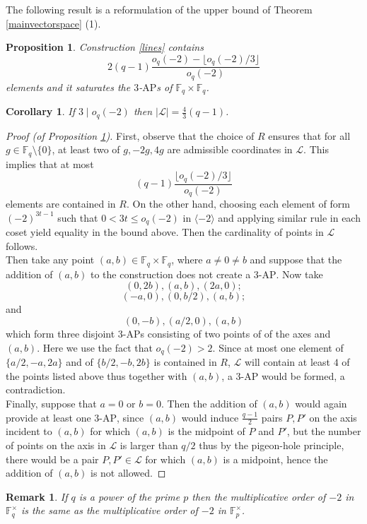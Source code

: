 \documentclass[11pt]{article}
\numberwithin{table}{section}
\newcommand{\cL}{{\mathcal L}}
\newcommand{\F}{{\mathbb F}}
\newtheorem{remark}[theorem]{Remark}
\newtheorem{cor}[theorem]{\bf Corollary}
\newtheorem{prop}[theorem]{\bf Proposition}
\theoremstyle{definition}
\begin{document}
	The following result is a reformulation of the upper bound of Theorem \ref{mainvectorspace} (1).
	
	\begin{prop}
		\label{linesp}
		Construction \ref{lines} contains $$2(q-1)\frac{o_q(-2)-\lfloor o_q(-2)/3\rfloor}{o_q(-2)}$$ elements and it saturates the $3$-$\mathrm{AP}$s of $\F_q\times \F_q$.  
	\end{prop}
	\begin{cor}
		If $3 \mid o_q(-2)$ then $|\cL|=\frac{4}{3}(q-1)$.
	\end{cor}
	
	\begin{proof}[Proof (of Proposition \ref{linesp})]
		First,  observe that the choice of $R$ ensures that for all $g\in \F_q\setminus \{0\}$, at least two of $g, -2g, 4g$ are admissible coordinates in $\cL$. This implies that at most $$(q-1)\frac{\lfloor o_q(-2)/3\rfloor}{o_q(-2)}$$ elements are contained in $R$. On the other hand, choosing  each element of form $(-2)^{3t-1} $ such that $ 0<3t\leq o_q(-2)$ in $\langle -2 \rangle$ and applying similar rule in each coset yield equality in the bound above. Then the cardinality of points in $\cL$ follows.\\
		Then take any point $(a,b)\in \F_q\times \F_q$, where $a\ne 0\ne b$ and suppose that the addition of $(a,b)$ to the construction does not create a $3$-$\mathrm{AP}$.
		Now take $$(0,2b), (a,b), (2a,0);$$
		$$(-a, 0), (0, b/2), (a,b);$$ and 
		$$(0,-b), (a/2, 0), (a, b)$$ which form three disjoint $3$-$\mathrm{AP}$s consisting of two points of of the axes and $(a,b)$. Here we use the fact  that $o_q(-2)>2$.
		Since at most one element of $\{a/2, -a, 2a\}$ and of $\{b/2, -b, 2b\}$ is contained in $R$, $\cL$ will contain at least $4$ of the points listed above thus together with $(a,b)$, a $3$-$\mathrm{AP}$ would be formed, a contradiction.\\
		Finally, suppose that $a=0$ or $b=0$. Then the addition of $(a,b)$ would again provide at least one $3$-$\mathrm{AP}$, since $(a,b)$ would induce $\frac{q-1}{2}$ pairs $P, P'$ on the axis incident to $(a,b)$ for which $(a,b)$ is the midpoint of $P$ and $P'$, but the number of points on the axis in $\cL$ is larger than $q/2$ thus by the pigeon-hole principle, there would be a pair $P, P'\in \cL$ for which $(a,b)$ is a midpoint, hence the addition of $(a,b)$ is not allowed.
	\end{proof}
	
	\begin{remark}
		If $q$ is a power of the prime $p$ then the multiplicative order of $-2$ in $\F_q^{\times}$ is the same as the multiplicative order of $-2$ in $\F_p^{\times}$.
	\end{remark}
	
\end{document}
